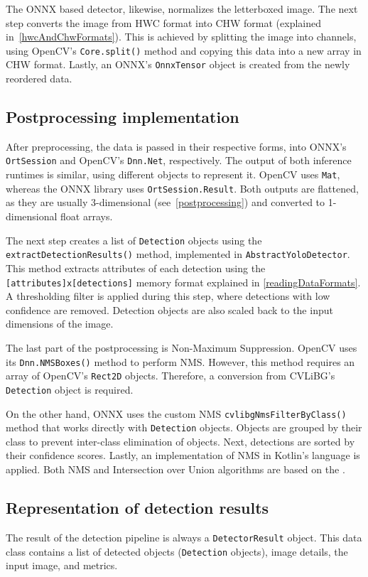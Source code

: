 The ONNX based detector, likewise, normalizes the letterboxed image. The next step converts the image from HWC format into CHW format (explained in~\ref{hwcAndChwFormats}). This is achieved by splitting the image into channels, using OpenCV's \texttt{Core.split()} method and copying this data into a new array in CHW format. Lastly, an ONNX's \texttt{OnnxTensor} object is created from the newly reordered data.

\subsection{Postprocessing implementation}
After preprocessing, the data is passed in their respective forms, into ONNX's \texttt{OrtSession} and OpenCV's \texttt{Dnn.Net}, respectively. The output of both inference runtimes is similar, using different objects to represent it. OpenCV uses \texttt{Mat}, whereas the ONNX library uses \texttt{OrtSession.Result}. Both outputs are flattened, as they are usually 3-dimensional (see~\ref{postprocessing}) and converted to 1-dimensional float arrays. 

The next step creates a list of \texttt{Detection} objects using the \texttt{extractDetectionResults()} method, implemented in \texttt{AbstractYoloDetector}. This method extracts attributes of each detection using the \texttt{[attributes]x[detections]} memory format explained in \ref{readingDataFormats}. A thresholding filter is applied during this step, where detections with low confidence are removed. Detection objects are also scaled back to the input dimensions of the image.

The last part of the postprocessing is Non-Maximum Suppression. OpenCV uses its \texttt{Dnn.NMSBoxes()} method to perform NMS. However, this method requires an array of OpenCV's \texttt{Rect2D} objects. Therefore, a conversion from CVLiBG's \texttt{Detection} object is required.

On the other hand, ONNX uses the custom NMS \texttt{cvlibgNmsFilterByClass()} method that works directly with \texttt{Detection} objects. Objects are grouped by their class to prevent inter-class elimination of objects. Next, detections are sorted by their confidence scores. Lastly, an implementation of NMS in Kotlin's language is applied. Both NMS and Intersection over Union algorithms are based on the \cite{opencvNMS}.

\subsection{Representation of detection results}
The result of the detection pipeline is always a \texttt{DetectorResult} object. This data class contains a list of detected objects (\texttt{Detection} objects), image details, the input image, and metrics.

